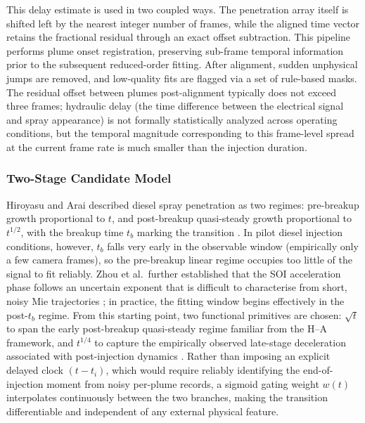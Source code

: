 This delay estimate is used in two coupled ways. The penetration array itself is shifted left by the nearest integer number of frames, while the aligned time vector retains the fractional residual through an exact offset subtraction. This pipeline performs plume onset registration, preserving sub-frame temporal information prior to the subsequent reduced-order fitting. After alignment, sudden unphysical jumps are removed, and low-quality fits are flagged via a set of rule-based masks. The residual offset between plumes post-alignment typically does not exceed three frames; hydraulic delay (the time difference between the electrical signal and spray appearance) is not formally statistically analyzed across operating conditions, but the temporal magnitude corresponding to this frame-level spread at the current frame rate is much smaller than the injection duration.

\subsubsection{Two-Stage Candidate Model}

Hiroyasu and Arai described diesel spray penetration as two regimes: pre-breakup growth proportional to \(t\), and post-breakup quasi-steady growth proportional to \(t^{1/2}\), with the breakup time \(t_b\) marking the transition \cite{HiroyasuArai1990}. In pilot diesel injection conditions, however, \(t_b\) falls very early in the observable window (empirically only a few camera frames), so the pre-breakup linear regime occupies too little of the signal to fit reliably. Zhou et al.\ further established that the SOI acceleration phase follows an uncertain exponent that is difficult to characterise from short, noisy Mie trajectories \cite{ZhouLiYi2021}; in practice, the fitting window begins effectively in the post-\(t_b\) regime. From this starting point, two functional primitives are chosen: \(\sqrt{t}\) to span the early post-breakup quasi-steady regime familiar from the H--A framework, and \(t^{1/4}\) to capture the empirically observed late-stage deceleration associated with post-injection dynamics \cite{ZhouLiLaiWei2019}. Rather than imposing an explicit delayed clock \((t-t_i)\), which would require reliably identifying the end-of-injection moment from noisy per-plume records, a sigmoid gating weight \(w(t)\) interpolates continuously between the two branches, making the transition differentiable and independent of any external physical feature.

